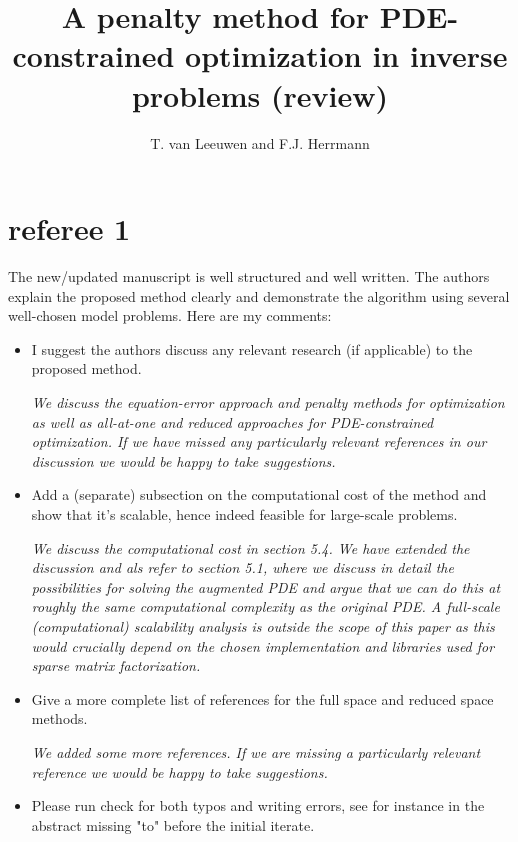\documentclass[12pt]{article}
\begin{document}
 
\title{A penalty method for PDE-constrained optimization in inverse problems (review)} 
\author{T. van Leeuwen and F.J. Herrmann} 
\date{} 
\maketitle 
\clearpage
\section{referee 1}
The new/updated manuscript is well structured and well written. The authors explain the proposed method clearly and demonstrate the algorithm using several well-chosen model problems. Here are my comments: 

\begin{itemize}
\item I suggest the authors discuss any relevant research (if applicable) to the proposed method. 

\vspace{5mm}\emph{We discuss the equation-error approach and penalty methods for optimization as well as all-at-one and reduced approaches for PDE-constrained optimization. If we have missed any particularly relevant references in our discussion we would be happy to take suggestions.}



\item Add a (separate) subsection on the computational cost of the method and show that it's scalable, hence indeed feasible for large-scale problems. 

\vspace{5mm}
\emph{We discuss the computational cost in section 5.4. We have extended the discussion and als refer to section 5.1, where we discuss in detail the possibilities for solving the augmented PDE and argue that we can do this at roughly the same computational complexity as the original PDE. A full-scale (computational) scalability analysis is outside the scope of this paper as this would crucially depend on the chosen implementation and libraries used for sparse matrix factorization.}

\item Give a more complete list of references for the full space and reduced space methods. 

\vspace{5mm}
\emph{We added some more references. If we are missing a particularly relevant reference we would be happy to take suggestions.}


\item Please run check for both typos and writing errors, see for instance in the abstract missing "to" before the initial iterate. 
\end{itemize}
\clearpage
\end{document}
